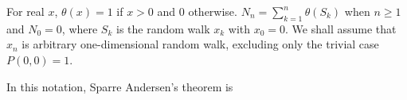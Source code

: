 For real $x$, $\theta(x) = 1$ if $x > 0$ and 0 otherwise. $N_n = \sum_{k=1}^{n} \theta(S_k)$ when $n \geq 1$ and $N_0 = 0$, where $S_k$ is the random walk $x_k$ with $x_0 = 0$. We shall assume that $x_n$ is arbitrary one-dimensional random walk, excluding only the trivial case $P(0,0) = 1$.

In this notation, Sparre Andersen's theorem is